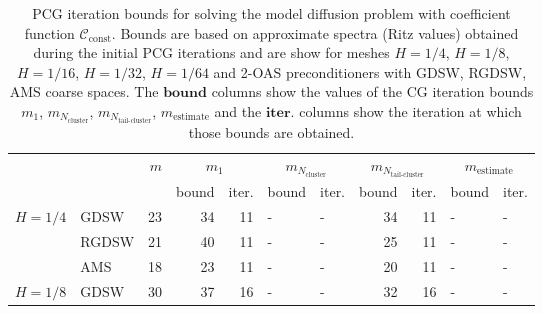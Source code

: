 \begin{table}[H]
\centering
\caption{PCG iteration bounds for solving the model diffusion problem with coefficient function $\mathcal{C}_{\mathrm{const}}$. Bounds are based on approximate spectra (Ritz values) obtained during the initial PCG iterations and are show for meshes $H=1/4$, $H=1/8$, $H=1/16$, $H=1/32$, $H=1/64$ and 2-OAS preconditioners with GDSW, RGDSW, AMS coarse spaces. The $\textbf{bound}$ columns show the values of the CG iteration bounds $m_1$, $m_{N_{\text{cluster}}}$, $m_{N_{\text{tail-cluster}}}$, $m_{\text{estimate}}$ and the $\textbf{iter.}$ columns show the iteration at which those bounds are obtained.}
\label{tab:cg_iteration_bound_coef=const}
\begin{tabular}{llrrrllrrll}
\toprule
 &  & \bfseries $m$ & \multicolumn{2}{|c|}{\bfseries $m_1$} & \multicolumn{2}{|c|}{\bfseries $m_{N_{\text{cluster}}}$} & \multicolumn{2}{|c|}{\bfseries $m_{N_{\text{tail-cluster}}}$} & \multicolumn{2}{|c|}{\bfseries $m_{\text{estimate}}$} \\
 &  &  & bound & iter. & bound & iter. & bound & iter. & bound & iter. \\
\midrule
\multirow[c]{3}{*}{\bfseries $H=1/4$} & GDSW & 23 & {\cellcolor[HTML]{405FE5}} \color[HTML]{F1F1F1} 34 & 11 & {\cellcolor[HTML]{ACB8F4}} \color[HTML]{000000} {\cellcolor[HTML]{E2E4FB}} - & - & {\cellcolor[HTML]{768BEC}} \color[HTML]{F1F1F1} 34 & 11 & {\cellcolor[HTML]{E2E4FB}} \color[HTML]{000000} {\cellcolor[HTML]{E2E4FB}} - & - \\
\cline{2-11}
\bfseries  & RGDSW & 21 & {\cellcolor[HTML]{768BEC}} \color[HTML]{F1F1F1} 40 & 11 & {\cellcolor[HTML]{ACB8F4}} \color[HTML]{000000} {\cellcolor[HTML]{E2E4FB}} - & - & {\cellcolor[HTML]{405FE5}} \color[HTML]{F1F1F1} 25 & 11 & {\cellcolor[HTML]{E2E4FB}} \color[HTML]{000000} {\cellcolor[HTML]{E2E4FB}} - & - \\
\cline{2-11}
\bfseries  & AMS & 18 & {\cellcolor[HTML]{768BEC}} \color[HTML]{F1F1F1} 23 & 11 & {\cellcolor[HTML]{ACB8F4}} \color[HTML]{000000} {\cellcolor[HTML]{E2E4FB}} - & - & {\cellcolor[HTML]{405FE5}} \color[HTML]{F1F1F1} 20 & 11 & {\cellcolor[HTML]{E2E4FB}} \color[HTML]{000000} {\cellcolor[HTML]{E2E4FB}} - & - \\
\cline{1-11} \cline{2-11}
\multirow[c]{3}{*}{\bfseries $H=1/8$} & GDSW & 30 & {\cellcolor[HTML]{768BEC}} \color[HTML]{F1F1F1} 37 & 16 & {\cellcolor[HTML]{ACB8F4}} \color[HTML]{000000} {\cellcolor[HTML]{E2E4FB}} - & - & {\cellcolor[HTML]{405FE5}} \color[HTML]{F1F1F1} 32 & 16 & {\cellcolor[HTML]{E2E4FB}} \color[HTML]{000000} {\cellcolor[HTML]{E2E4FB}} - & - \\

\end{tabular}
\end{table}
